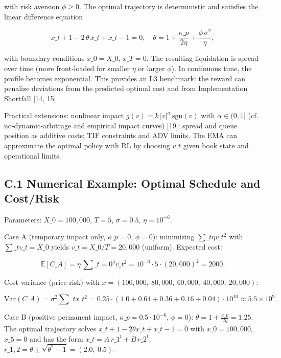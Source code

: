 \documentclass[11pt,a4paper]{article}
\begin{document}
with risk aversion $\phi\ge 0$. The optimal trajectory is deterministic and satisfies the linear difference equation

\begin{equation}
x\_{t+1} - 2\,\theta\,x\_t + x\_{t-1} = 0,\quad \theta = 1 + \frac{\kappa\_p}{2\eta} + \frac{\phi\,\sigma^2}{\eta},
\end{equation}

with boundary conditions $x\_0=X\_0$, $x\_T=0$. The resulting liquidation is spread over time (more front‑loaded for smaller $\eta$ or larger $\phi$). In continuous time, the profile becomes exponential. This provides an L3 benchmark: the reward can penalize deviations from the predicted optimal cost and from Implementation Shortfall [14, 15].

Practical extensions: nonlinear impact $g(v)=k\,|v|^\alpha\,\mathrm{sgn}(v)$ with $\alpha\in(0,1]$ (cf. no‑dynamic‑arbitrage and empirical impact curves) [19]; spread and queue position as additive costs; TIF constraints and ADV limits. The EMA can approximate the optimal policy with RL by choosing $v\_t$ given book state and operational limits.

\subsection{C.1 Numerical Example: Optimal Schedule and Cost/Risk}

Parameters: $X\_0=100,000$, $T=5$, $\sigma=0.5$, $\eta=10^{-6}$.

Case A (temporary impact only, $\kappa\_p=0$, $\phi=0$): minimizing $\sum\_t \eta v\_t^2$ with $\sum\_t v\_t=X\_0$ yields $v\_t=X\_0/T=20,000$ (uniform). Expected cost:

\begin{equation}
\mathbb{E}[C\_A] = \eta\,\sum\_{t=0}^{4} v\_t^2 = 10^{-6}\cdot 5 \cdot (20,000)^2 = 2000.
\end{equation}

Cost variance (price risk) with $x=(100,000,\ 80,000,\ 60,000,\ 40,000,\ 20,000)$:

\begin{equation}
\mathrm{Var}(C\_A) = \sigma^2\sum\_t x\_t^2 = 0.25\cdot(1.0+0.64+0.36+0.16+0.04)\cdot 10^{10} \approx 5.5\times 10^9.
\end{equation}

Case B (positive permanent impact, $\kappa\_p=0.5\cdot 10^{-6}$, $\phi=0$): $\theta = 1 + \tfrac{\kappa\_p}{2\eta} = 1.25$. The optimal trajectory solves $x\_{t+1}-2\theta x\_t + x\_{t-1}=0$ with $x\_0=100,000$, $x\_5=0$ and has the form $x\_t = A\,r\_1^t + B\,r\_2^t$, $r\_{1,2}=\theta\pm\sqrt{\theta^2-1}=(2.0,\ 0.5)$. 
\end{document}
